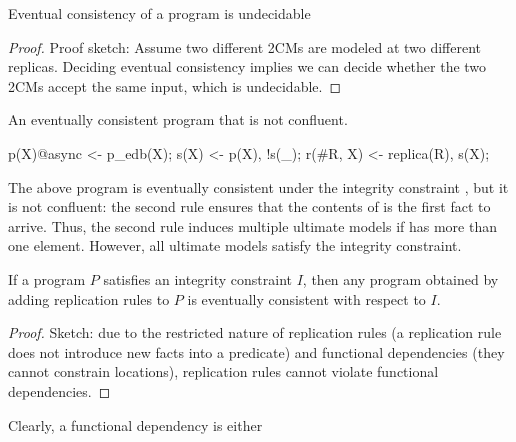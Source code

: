 
\begin{lemma}
Eventual consistency of a \lang program is undecidable
\end{lemma}
\begin{proof}
Proof sketch: Assume two different 2CMs are modeled at two different replicas.  Deciding eventual consistency implies we can decide whether the two 2CMs accept the same input, which is undecidable.
\end{proof}


\begin{example}
An eventually consistent program that is not confluent.

\begin{Dedalus}
p(X)@async <- p_edb(X);
s(X) <- p(X), !s(_);
r(#R, X) <- replica(R), s(X);
\end{Dedalus}
\end{example}

The above program is eventually consistent under the integrity constraint , but it is not confluent: the second rule ensures that the contents of  is the first  fact to arrive.  Thus, the second rule induces multiple ultimate models if  has more than one element.  However, all ultimate models satisfy the integrity constraint.

\begin{lemma}
If a program $P$ satisfies an integrity constraint $I$, then any program obtained by adding replication rules to $P$ is eventually consistent with respect to $I$.
\end{lemma}
\begin{proof}
Sketch: due to the restricted nature of replication rules (a replication rule does not introduce new facts into a predicate) and functional dependencies (they cannot constrain locations), replication rules cannot violate functional dependencies.
\end{proof}

Clearly, a functional dependency is either

\begin{lemma}

\end{lemma}
